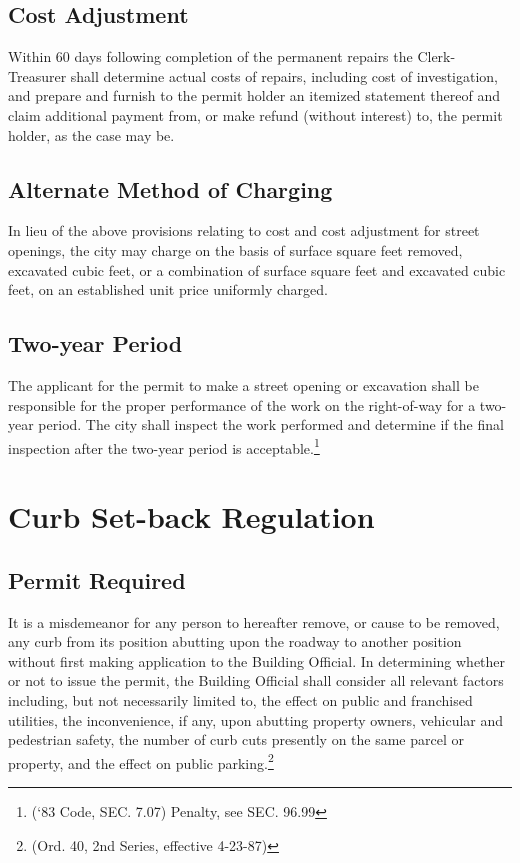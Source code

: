 \subsection{Cost Adjustment}
Within 60 days following completion of the permanent repairs the Clerk-Treasurer shall determine actual costs of repairs, including cost of investigation, and prepare and furnish to the permit holder an itemized statement thereof and claim additional payment from, or make refund (without interest) to, the permit holder, as the case may be.
\subsection{Alternate Method of Charging}
In lieu of the above provisions relating to cost and cost adjustment for street openings, the city may charge on the basis of surface square feet removed, excavated cubic feet, or a combination of surface square feet and excavated cubic feet, on an established unit price uniformly charged.
\subsection{Two-year Period}
The applicant for the permit to make a street opening or excavation shall be responsible for the proper performance of the work on the right-of-way for a two-year period.  The city shall inspect the work performed and determine if the final inspection after the two-year period is acceptable.\footnote{(‘83 Code, SEC. 7.07)  Penalty, see SEC. 96.99}

\section{Curb Set-back Regulation}
\subsection{Permit Required}
It is a misdemeanor for any person to hereafter remove, or cause to be removed, any curb from its position abutting upon the roadway to another position without first making application to the Building Official.  In determining whether or not to issue the permit, the Building Official shall consider all relevant factors including, but not necessarily limited to, the effect on public and franchised utilities, the inconvenience, if any, upon abutting property owners, vehicular and pedestrian safety, the number of curb cuts presently on the same parcel or property, and the effect on public parking.\footnote{(Ord. 40, 2nd Series, effective 4-23-87)}
